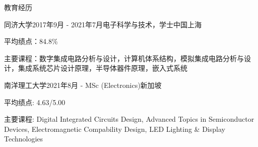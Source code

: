 \documentclass{resume} %
\begin{document}

\begin{rSection}{教育经历}
	
	\begin{rSubsection}{同济大学}{2017年9月 - 2021年7月}{电子科学与技术，学士}{中国上海}
		\item 平均绩点：84.8\% 
		\item 主要课程：数字集成电路分析与设计，计算机体系结构，模拟集成电路分析与设计，集成系统芯片设计原理，半导体器件原理，嵌入式系统
	\end{rSubsection}

	\begin{rSubsection}{南洋理工大学}{2021年8月 - }{MSc (Electronics)}{新加坡}
		\item 平均绩点: 4.63/5.00
		\item 主要课程: Digital Integrated Circuits Design, Advanced Topics in Semiconductor Devices, Electromagnetic Compability Design, LED Lighting \& Display Technologies
	\end{rSubsection}

\end{rSection}
\end{document}
